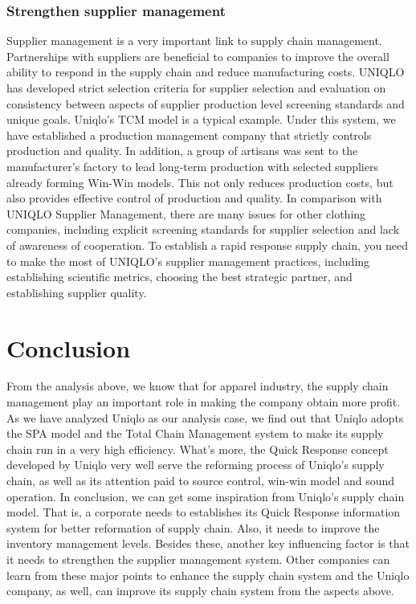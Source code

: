 \documentclass[12pt,a4paper]{article}
\begin{document}
\hypertarget{strengthen-supplier-management}{%
\subsubsection{Strengthen supplier
management}\label{strengthen-supplier-management}}

Supplier management is a very important link to supply chain management.
Partnerships with suppliers are beneficial to companies to improve the
overall ability to respond in the supply chain and reduce manufacturing
costs. UNIQLO has developed strict selection criteria for supplier
selection and evaluation on consistency between aspects of supplier
production level screening standards and unique goals. Uniqlo's TCM
model is a typical example. Under this system, we have established a
production management company that strictly controls production and
quality. In addition, a group of artisans was sent to the manufacturer's
factory to lead long-term production with selected suppliers already
forming Win-Win models. This not only reduces production costs, but also
provides effective control of production and quality. In comparison with
UNIQLO Supplier Management, there are many issues for other clothing
companies, including explicit screening standards for supplier selection
and lack of awareness of cooperation. To establish a rapid response
supply chain, you need to make the most of UNIQLO's supplier management
practices, including establishing scientific metrics, choosing the best
strategic partner, and establishing supplier quality.

\hypertarget{conclusion}{%
\section{Conclusion}\label{conclusion}}

From the analysis above, we know that for apparel industry, the supply
chain management play an important role in making the company obtain
more profit. As we have analyzed Uniqlo as our analysis case, we find
out that Uniqlo adopts the SPA model and the Total Chain Management
system to make its supply chain run in a very high efficiency. What's
more, the Quick Response concept developed by Uniqlo very well serve the
reforming process of Uniqlo's supply chain, as well as its attention
paid to source control, win-win model and sound operation. In
conclusion, we can get some inspiration from Uniqlo's supply chain
model. That is, a corporate needs to establishes its Quick Response
information system for better reformation of supply chain. Also, it
needs to improve the inventory management levels. Besides these, another
key influencing factor is that it needs to strengthen the supplier
management system. Other companies can learn from these major points to
enhance the supply chain system and the Uniqlo company, as well, can
improve its supply chain system from the aspects above.
\end{document}
